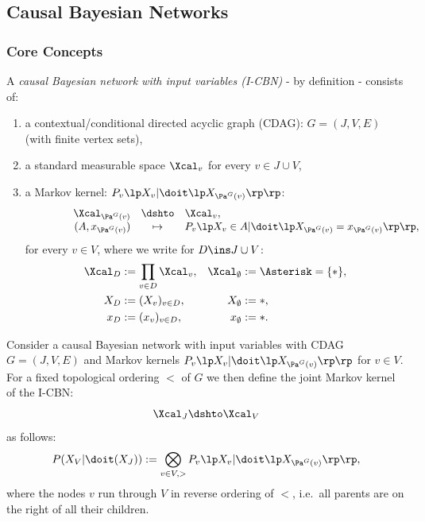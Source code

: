 \subsection{Causal Bayesian Networks}

\subsubsection{Core Concepts}

\begin{Def}
    \label{def-I-CBN}
    A \emph{causal Bayesian network with input variables (I-CBN)} - by definition - consists of:
    \begin{enumerate}[label=\alph*.)]
        \item a contextual/conditional directed acyclic graph (CDAG): $G = (J,V,E)$ (with finite vertex sets),
        \item a standard measurable space $\Xcal_v$ for every $v \in J \cup V$,
        \item a Markov kernel: $\displaystyle  P_v\lp X_v|\doit\lp X_{\Pa^G(v)}\rp\rp$:
        \[\begin{array}{ccrcl}
           & & \Xcal_{\Pa^G(v)} & \dshto & \Xcal_v, \\
           && \qquad (A,x_{\Pa^G(v)}) & \mapsto &  P_v\lp X_v \in A|\doit\lp X_{\Pa^G(v)} = x_{\Pa^G(v)} \rp\rp,
        \end{array}\]
        for every $v \in V$, where we write for $D \ins J \cup V$:
               \begin{align*} 
                   \Xcal_D &:= \prod_{v \in D} \Xcal_v,&
                   \Xcal_\emptyset &:= \Asterisk = \{\ast\},\\
                   X_D &:= (X_v)_{v \in D},&
                   X_\emptyset &:= \ast,\\
                   x_D &:= (x_v)_{v \in D},&
                   x_\emptyset &:= \ast.
              \end{align*}
    \end{enumerate}
\end{Def}

\begin{Def}
    Consider a causal Bayesian network with input variables with CDAG $G=(J,V,E)$ and Markov kernels
    $P_v\lp X_v|\doit\lp X_{\Pa^G(v)}\rp\rp$ for $v \in V$.
    For a fixed topological ordering $<$ of $G$ 
    we  then define the joint Markov kernel of the I-CBN:
    \[ \Xcal_J \dshto \Xcal_V\]
    as follows:
    \[  P(X_V|\doit(X_J)) := \bigotimes_{v \in V, >} P_v\lp X_v|\doit\lp X_{\Pa^G(v)}\rp\rp,  \]
    where the nodes $v$ run through $V$ in reverse ordering of $<$, i.e.\ 
    all parents are on the right of all their children.
\end{Def}

